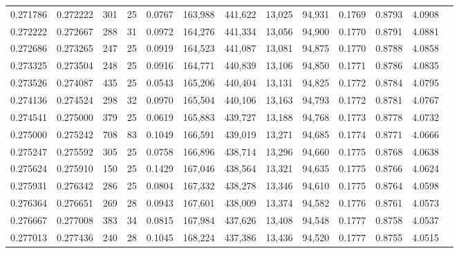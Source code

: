 \begin{tabular}{rrrrrrrrrrrrr}
0.271786 & 0.272222 &    301 &    25 &                                     0.0767 & 163,988 & 441,622 &  13,025 &  94,931 & 0.1769 & 0.8793 & 4.0908 \\
0.272222 & 0.272667 &    288 &    31 &                                     0.0972 & 164,276 & 441,334 &  13,056 &  94,900 & 0.1770 & 0.8791 & 4.0881 \\
0.272686 & 0.273265 &    247 &    25 &                                     0.0919 & 164,523 & 441,087 &  13,081 &  94,875 & 0.1770 & 0.8788 & 4.0858 \\
0.273325 & 0.273504 &    248 &    25 &                                     0.0916 & 164,771 & 440,839 &  13,106 &  94,850 & 0.1771 & 0.8786 & 4.0835 \\
0.273526 & 0.274087 &    435 &    25 &                                     0.0543 & 165,206 & 440,404 &  13,131 &  94,825 & 0.1772 & 0.8784 & 4.0795 \\
0.274136 & 0.274524 &    298 &    32 &                                     0.0970 & 165,504 & 440,106 &  13,163 &  94,793 & 0.1772 & 0.8781 & 4.0767 \\
0.274541 & 0.275000 &    379 &    25 &                                     0.0619 & 165,883 & 439,727 &  13,188 &  94,768 & 0.1773 & 0.8778 & 4.0732 \\
0.275000 & 0.275242 &    708 &    83 &                                     0.1049 & 166,591 & 439,019 &  13,271 &  94,685 & 0.1774 & 0.8771 & 4.0666 \\
0.275247 & 0.275592 &    305 &    25 &                                     0.0758 & 166,896 & 438,714 &  13,296 &  94,660 & 0.1775 & 0.8768 & 4.0638 \\
0.275624 & 0.275910 &    150 &    25 &                                     0.1429 & 167,046 & 438,564 &  13,321 &  94,635 & 0.1775 & 0.8766 & 4.0624 \\
0.275931 & 0.276342 &    286 &    25 &                                     0.0804 & 167,332 & 438,278 &  13,346 &  94,610 & 0.1775 & 0.8764 & 4.0598 \\
0.276364 & 0.276651 &    269 &    28 &                                     0.0943 & 167,601 & 438,009 &  13,374 &  94,582 & 0.1776 & 0.8761 & 4.0573 \\
0.276667 & 0.277008 &    383 &    34 &                                     0.0815 & 167,984 & 437,626 &  13,408 &  94,548 & 0.1777 & 0.8758 & 4.0537 \\
0.277013 & 0.277436 &    240 &    28 &                                     0.1045 & 168,224 & 437,386 &  13,436 &  94,520 & 0.1777 & 0.8755 & 4.0515 \\

\end{tabular}
